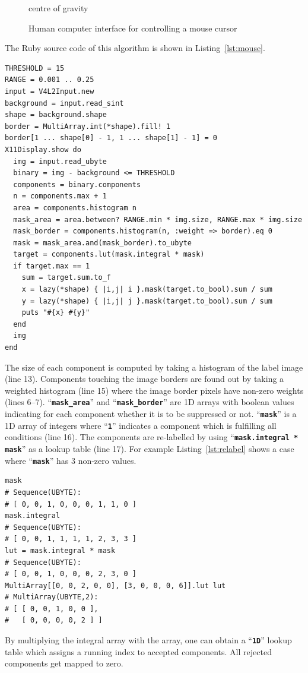 \documentclass[12pt,a4paper,oneside,openright]{book}
\newcommand{\Eg}{For ex\-am\-ple }
\newcommand{\lst}[1]{Listing~\ref{lst:#1}}
\newcommand{\code}[1]{``\texttt{\textbf{\textcolor{codegray}{\small{#1}}}}''}
\begin{document}
\begin{CJK}{UTF8}{}
\begin{figure}[htbp]
\begin{center}
\begin{minipage}[t]{.32\textwidth}
\begin{center}
        centre of gravity
      \end{center}
    \end{minipage}
    \caption{Human computer interface for controlling a mouse cursor\label{fig:mouse}}
  \end{center}
\end{figure}

The Ruby source code of this algorithm is shown in \lst{mouse}.
\lstset{language=Ruby,frame=single,numbers=left}
\begin{lstlisting}[float,caption={Human computer interface for controlling the mouse cursor},escapechar=\$,label=lst:mouse]
THRESHOLD = 15
RANGE = 0.001 .. 0.25
input = V4L2Input.new
background = input.read_sint
shape = background.shape
border = MultiArray.int(*shape).fill! 1
border[1 ... shape[0] - 1, 1 ... shape[1] - 1] = 0
X11Display.show do
  img = input.read_ubyte
  binary = img - background <= THRESHOLD
  components = binary.components
  n = components.max + 1
  area = components.histogram n
  mask_area = area.between? RANGE.min * img.size, RANGE.max * img.size
  mask_border = components.histogram(n, :weight => border).eq 0
  mask = mask_area.and(mask_border).to_ubyte
  target = components.lut(mask.integral * mask)
  if target.max == 1
    sum = target.sum.to_f
    x = lazy(*shape) { |i,j| i }.mask(target.to_bool).sum / sum
    y = lazy(*shape) { |i,j| j }.mask(target.to_bool).sum / sum
    puts "#{x} #{y}"
  end
  img
end
\end{lstlisting}
The size of each component is computed by taking a histogram of the label image (line 13). Components touching the image borders are found out by taking a weighted histogram (line 15) where the image border pixels have non-zero weights (lines 6--7). \code{mask\_area} and \code{mask\_border} are \ac{1D} arrays with boolean values indicating for each component whether it is to be suppressed or not. \code{mask} is a \ac{1D} array of integers where \code{1} indicates a component which is fulfilling all conditions (line 16). The components are re-labelled by using \code{mask.integral * mask} as a lookup table (line 17). \Eg \lst{relabel} shows a case where \code{mask} has 3 non-zero values.
\lstset{language=Ruby,frame=single,numbers=none}
\begin{lstlisting}[float,caption={Lookup table for re-labelling},escapechar=\$,label=lst:relabel]
mask
# Sequence(UBYTE):
# [ 0, 0, 1, 0, 0, 0, 1, 1, 0 ]
mask.integral
# Sequence(UBYTE):
# [ 0, 0, 1, 1, 1, 1, 2, 3, 3 ]
lut = mask.integral * mask
# Sequence(UBYTE):
# [ 0, 0, 1, 0, 0, 0, 2, 3, 0 ]
MultiArray[[0, 0, 2, 0, 0], [3, 0, 0, 0, 6]].lut lut
# MultiArray(UBYTE,2):
# [ [ 0, 0, 1, 0, 0 ],
#   [ 0, 0, 0, 0, 2 ] ]
\end{lstlisting}
By multiplying the integral array with the array, one can obtain a \code{1D} lookup table which assigns a running index to accepted components. All rejected components get mapped to zero.


\end{CJK}
\end{document}
